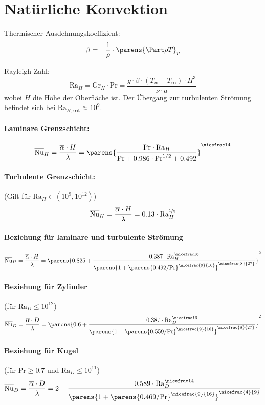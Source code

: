 
\section{Natürliche Konvektion} %
	Thermischer Ausdehnungskoeffizient:
	\[
		\beta = - \frac 1 \rho \cdot \parens{ \Part \rho T }_p
	\]

	Rayleigh-Zahl:
	\[
		\mathrm{Ra}_H = \mathrm{Gr}_H \cdot \mathrm{Pr} = \frac{g \cdot \beta \cdot (T_w - T_\infty) \cdot H^3}{\nu \cdot a}
	\]
	wobei $H$ die Höhe der Oberfläche ist. Der Übergang zur turbulenten Strömung befindet sich bei $\mathrm{Ra}_{H\text{,krit}} \approx 10^9$.

	\paragraph{Laminare Grenzschicht:} %
		\[
			\overline{\mathrm{Nu}}_H = \frac{\overline{\alpha} \cdot H}{\lambda} =
			\parens{\frac{\mathrm{Pr} \cdot \mathrm{Ra}_H}{\mathrm{Pr} + 0.986 \cdot \mathrm{Pr}^{1/2} + 0.492}}^{\nicefrac 1 4}
		\]

	\paragraph{Turbulente Grenzschicht:} %
		(Gilt für $\mathrm{Ra}_H \in (10^9,10^{12})$)
		\[
			\overline{\mathrm{Nu}}_H = \frac{\overline{\alpha} \cdot H}{\lambda} =
			0.13 \cdot \mathrm{Ra}_H^{\nicefrac 1 3}
		\]

	\paragraph{Beziehung für laminare und turbulente Strömung} %
		\[
			\overline{\mathrm{Nu}}_H = \frac{\overline{\alpha} \cdot H}{\lambda} = \parens{0.825 + \frac{0.387 \cdot \mathrm{Ra}_H^{\nicefrac 1 6}}{\parens{1 + \parens{0.492 / \mathrm{Pr}}^{\nicefrac{9}{16}}}^{\nicefrac{8}{27}}}}^2
		\]

	\paragraph{Beziehung für Zylinder} %
		(für $\mathrm{Ra}_D \leq 10^{12}$)
		\[
			\overline{\mathrm{Nu}}_D = \frac{\overline{\alpha} \cdot D}{\lambda} = \parens{0.6 + \frac{0.387 \cdot \mathrm{Ra}_D^{\nicefrac 1 6}}{\parens{1 + \parens{0.559 / \mathrm{Pr}}^{\nicefrac{9}{16}}}^{\nicefrac{8}{27}}}}^2
		\]

	\paragraph{Beziehung für Kugel} %
		(für $\mathrm{Pr} \geq 0.7$ und $\mathrm{Ra}_D \leq 10^{11}$)
		\[
			\overline{\mathrm{Nu}}_D = \frac{\overline{\alpha} \cdot D}{\lambda} = 2 + \frac{0.589 \cdot \mathrm{Ra}_D^{\nicefrac 1 4}}{\parens{1 + \parens{0.469 / \mathrm{Pr}}^{\nicefrac{9}{16}}}^{\nicefrac{4}{9}}}
		\]
